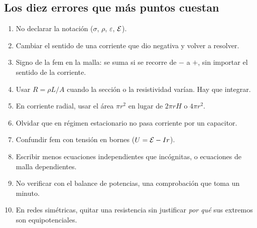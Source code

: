 \documentclass[11pt]{article}
\begin{document}
\subsection{Los diez errores que más puntos cuestan}
\begin{enumerate}
\item No declarar la notación ($\sigma$, $\rho$, $\varepsilon$, $\mathcal{E}$).
\item Cambiar el sentido de una corriente que dio negativa y volver a resolver.
\item Signo de la fem en la malla: se suma si se recorre de $-$ a $+$, sin importar el sentido de la corriente.
\item Usar $R=\rho L/A$ cuando la sección o la resistividad varían. Hay que integrar.
\item En corriente radial, usar el área $\pi r^2$ en lugar de $2\pi rH$ o $4\pi r^2$.
\item Olvidar que en régimen estacionario no pasa corriente por un capacitor.
\item Confundir fem con tensión en bornes ($U=\mathcal{E}-Ir$).
\item Escribir menos ecuaciones independientes que incógnitas, o ecuaciones de malla dependientes.
\item No verificar con el balance de potencias, una comprobación que toma un minuto.
\item En redes simétricas, quitar una resistencia sin justificar \emph{por qué} sus extremos son equipotenciales.
\end{enumerate}

\end{document}
